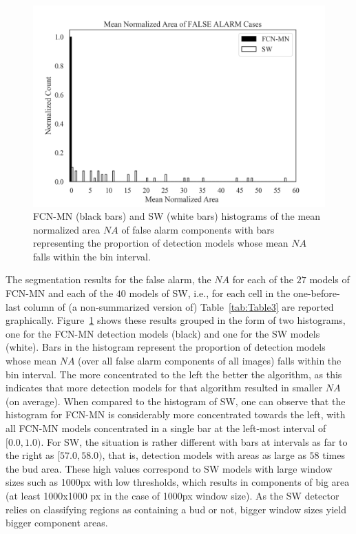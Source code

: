 \documentclass[a4paper,authoryear,review]{elsarticle}
\begin{document}
	
	
	\begin{figure}%
		\centering
		\includegraphics[width=\textwidth]{figures/Figure6.png}%
		\caption{
			FCN-MN (black bars) and SW (white bars) histograms of the mean normalized area $NA$ of false alarm components with bars representing the proportion of detection models whose mean $NA$ falls within the bin interval.
		}
		\label{fig:Figure6}
	\end{figure}
	
	
	The segmentation results for the false alarm, the $NA$  for each of the $27$ models of FCN-MN and each of the $40$ models of SW, i.e., for each cell in the  one-before-last column of (a non-summarized version of) Table~\ref{tab:Table3} are reported graphically. Figure~\ref{fig:Figure6} shows these results grouped in the form of two histograms, one for the FCN-MN detection models (black) and one for the SW models  (white). Bars in the histogram represent the proportion of detection models whose mean $NA$ (over all false alarm components of all images) falls within the bin interval. The more concentrated to the left the better the algorithm, as this indicates that more detection models for that algorithm resulted in smaller $NA$ (on average). When compared to the histogram of SW, one can observe that the histogram for FCN-MN is considerably more concentrated towards the left, with all FCN-MN models concentrated in a single bar at the left-most interval of $[0.0, 1.0)$. For SW, the situation is rather different with bars at intervals as far to the right as $[57.0, 58.0)$, that is, detection models with areas as large as $58$ times the bud area. These high values correspond to SW models with large window sizes such as 1000px with low thresholds, which results in components of big area (at least 1000x1000 px in the case of 1000px window size). As the SW detector relies on classifying regions as containing a bud or not, bigger window sizes yield bigger component areas.
	
\end{document}
